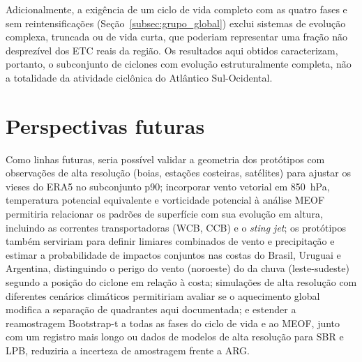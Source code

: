 Adicionalmente, a exigência de um ciclo de vida completo com as quatro fases e sem reintensificações (Seção~\ref{subsec:grupo_global}) exclui sistemas de evolução complexa, truncada ou de vida curta, que poderiam representar uma fração não desprezível dos ETC reais da região. Os resultados aqui obtidos caracterizam, portanto, o subconjunto de ciclones com evolução estruturalmente completa, não a totalidade da atividade ciclônica do Atlântico Sul-Ocidental.

\section{Perspectivas futuras}

Como linhas futuras, seria possível validar a geometria dos protótipos com observações de alta resolução (boias, estações costeiras, satélites) para ajustar os vieses do ERA5 no subconjunto p90; incorporar vento vetorial em 850~hPa, temperatura potencial equivalente e vorticidade potencial à análise MEOF permitiria relacionar os padrões de superfície com sua evolução em altura, incluindo as correntes transportadoras (WCB, CCB) e o \textit{sting jet}; os protótipos também serviriam para definir limiares combinados de vento e precipitação e estimar a probabilidade de impactos conjuntos nas costas do Brasil, Uruguai e Argentina, distinguindo o perigo do vento (noroeste) do da chuva (leste-sudeste) segundo a posição do ciclone em relação à costa; simulações de alta resolução com diferentes cenários climáticos permitiriam avaliar se o aquecimento global modifica a separação de quadrantes aqui documentada; e estender a reamostragem Bootstrap-t a todas as fases do ciclo de vida e ao MEOF, junto com um registro mais longo ou dados de modelos de alta resolução para SBR e LPB, reduziria a incerteza de amostragem frente a ARG.
